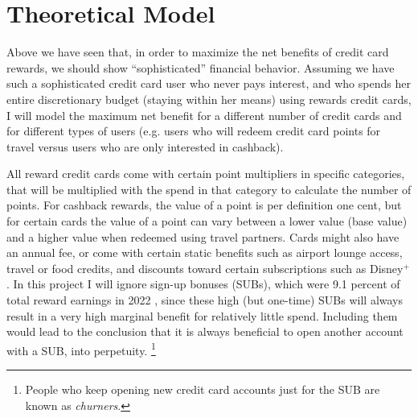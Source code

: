 \section{Theoretical Model} \label{sec:Theory}

Above we have seen that, in order to maximize the net benefits of credit card rewards, 
we should show ``sophisticated'' financial behavior.
Assuming we have such a sophisticated credit card user who never pays interest, and who spends her entire discretionary budget (staying within her means) using rewards credit cards, I will model the maximum net benefit for a different number of credit cards and for different types of users (e.g. users who will redeem credit card points for travel versus users who are only interested in cashback).

All reward credit cards come with certain point multipliers in specific categories, that will be multiplied with the spend in that category to calculate the number of points. 
For cashback rewards, the value of a point is per definition one cent, but for certain cards the value of a point can vary between a lower value (base value) and a higher value when redeemed using travel partners. 
Cards might also have an annual fee, or come with certain static benefits such as airport lounge access, travel or food credits, and discounts toward certain subscriptions such as Disney$^{+}$. 
In this project I will ignore sign-up bonuses (SUBs), which were 9.1 percent of total reward earnings in 2022 \citep{cfpb:2023}, since these high (but one-time) SUBs will always result in a very high marginal benefit for relatively little spend. Including them would  lead to the conclusion that it is always beneficial to open another account with a SUB, into perpetuity.%
\footnote{People who keep opening new credit card accounts just for the SUB are known as \emph{churners}.}  

